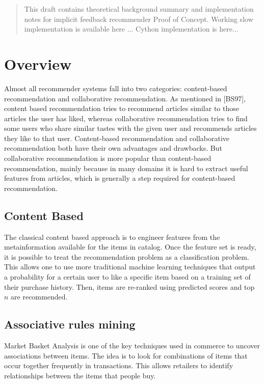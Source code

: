 \documentclass[12pt]{article}
\begin{document}
\maketitle

\begin{abstract}
This draft contains theoretical background summary and implementation notes for implicit feedback recommender Proof of Concept. Working slow implementation is available here ... Cython implementation is here...
\end{abstract}

\section{Overview}
Almost all recommender systems fall into two categories: content-based recommendation and collaborative recommendation. As mentioned in [BS97], content based recommendation tries to recommend articles similar to those articles the user has liked, whereas collaborative recommendation tries to find some users who share similar tastes with the given user and recommends articles they like to that user. Content-based recommendation and collaborative recommendation both have their own advantages and drawbacks. But collaborative recommendation is more popular than content-based recommendation, mainly because in many domains it is hard to extract useful features from articles, which is
generally a step required for content-based recommendation.
\subsection{Content Based}
The classical content based approach is to engineer features from the metainformation available for the items in catalog. Once the feature set is ready, it is possible to treat the recommendation problem as a classification problem. This allows one to use more traditional machine learning techniques that output a probability for a certain user to like a specific item based on a training set of their purchase history. Then, items are re-ranked using predicted scores and top $n$ are recommended.

\subsection{Associative rules mining}
Market Basket Analysis is one of the key techniques used in commerce to uncover associations between items. 
The idea is to look for combinations of items that occur together frequently in transactions. This allows retailers to identify relationships between the items that people buy.
\end{document}
